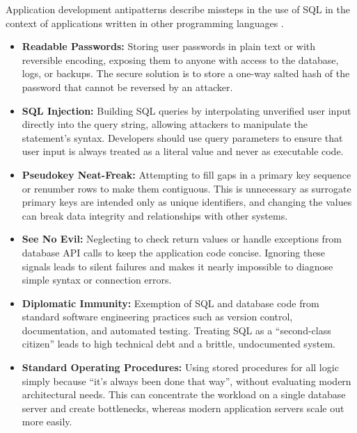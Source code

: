 Application development antipatterns describe missteps in the use of SQL in the context of applications written in other programming languages .

\begin{itemize}
    \item \textbf{Readable Passwords:}  Storing user passwords in plain text or with reversible encoding, exposing them to anyone with access to the database, logs, or backups. The secure solution is to store a one-way salted hash of the password that cannot be reversed by an attacker.
    \item \textbf{SQL Injection:}  Building SQL queries by interpolating unverified user input directly into the query string, allowing attackers to manipulate the statement's syntax. Developers should use query parameters to ensure that user input is always treated as a literal value and never as executable code.
    \item \textbf{Pseudokey Neat-Freak:}  Attempting to fill gaps in a primary key sequence or renumber rows to make them contiguous. This is unnecessary as surrogate primary keys are intended only as unique identifiers, and changing the values can break data integrity and relationships with other systems.
    \item \textbf{See No Evil:}  Neglecting to check return values or handle exceptions from database API calls to keep the application code concise. Ignoring these signals leads to silent failures and makes it nearly impossible to diagnose simple syntax or connection errors.
    \item \textbf{Diplomatic Immunity:}  Exemption of SQL and database code from standard software engineering practices such as version control, documentation, and automated testing. Treating SQL as a “second-class citizen” leads to high technical debt and a brittle, undocumented system.
    \item \textbf{Standard Operating Procedures:}  Using stored procedures for all logic simply because “it's always been done that way”, without evaluating modern architectural needs. This can concentrate the workload on a single database server and create bottlenecks, whereas modern application servers scale out more easily.
\end{itemize}

